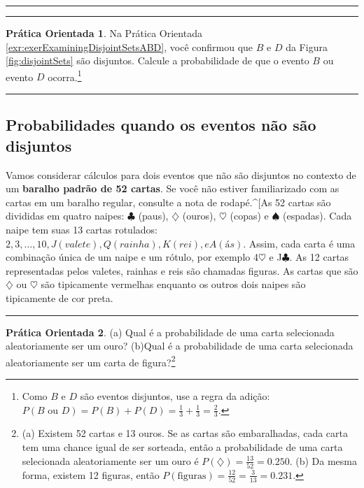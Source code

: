 \documentclass[
]{book}
\theoremstyle{definition}
\theoremstyle{definition}
\theoremstyle{definition}
\newtheorem{exercise}{Prática Orientada}[chapter]
\theoremstyle{definition}
\theoremstyle{remark}
\begin{document}
\begin{center}\rule{0.5\linewidth}{0.5pt}\end{center}

\begin{center}\rule{0.5\linewidth}{0.5pt}\end{center}

\begin{exercise}
\protect\hypertarget{exr:unnamed-chunk-46}{}{\label{exr:unnamed-chunk-46} }Na Prática Orientada \ref{exr:exerExaminingDisjointSetsABD}, você confirmou que \(B\) e \(D\) da Figura \ref{fig:disjointSets} são disjuntos. Calcule a probabilidade de que o evento \(B\) ou evento \(D\) ocorra.\footnote{Como \(B\) e \(D\) são eventos disjuntos, use a regra da adição: \(P(B \text{ ou } D) = P(B) + P(D) = \frac{1}{3} + \frac{1}{3} = \frac{2}{3}\).}
\end{exercise}

\begin{center}\rule{0.5\linewidth}{0.5pt}\end{center}

\hypertarget{probabilityEventsNotDisjoint}{%
\subsection{Probabilidades quando os eventos não são disjuntos}\label{probabilityEventsNotDisjoint}}

Vamos considerar cálculos para dois eventos que não são disjuntos no contexto de um \textbf{baralho padrão de 52 cartas}. Se você não estiver familiarizado com as cartas em um baralho regular, consulte a nota de rodapé.\^{}{[}As 52 cartas são divididas em quatro naipes: \(\clubsuit\) (paus), \(\diamondsuit\) (ouros), \(\heartsuit\) (copas) e \(\spadesuit\) (espadas). Cada naipe tem suas 13 cartas rotulados: \(2, 3, \dots, 10, J (valete), Q (rainha), K (rei), e A (ás)\). Assim, cada carta é uma combinação única de um naipe e um rótulo, por exemplo 4\(\heartsuit\) e J\(\clubsuit\). As 12 cartas representadas pelos valetes, rainhas e reis são chamadas figuras. As cartas que são \(\diamondsuit\) ou \(\heartsuit\) são tipicamente vermelhas enquanto os outros dois naipes são tipicamente de cor preta.

\begin{center}\rule{0.5\linewidth}{0.5pt}\end{center}

\begin{exercise}
\protect\hypertarget{exr:unnamed-chunk-47}{}{\label{exr:unnamed-chunk-47} }(a) Qual é a probabilidade de uma carta selecionada aleatoriamente ser um ouro?
(b)Qual é a probabilidade de uma carta selecionada aleatoriamente ser um carta de figura?\footnote{(a) Existem 52 cartas e 13 ouros. Se as cartas são embaralhadas, cada carta tem uma chance igual de ser sorteada, então a probabilidade de uma carta selecionada aleatoriamente ser um ouro é \(P(\diamondsuit) = \frac{13}{52} = 0.250\). (b) Da mesma forma, existem 12 figuras, então \(P(\text{figuras}) = \frac{12}{52} = \frac{3}{13} = 0.231\).}
\end{exercise}
\end{document}
